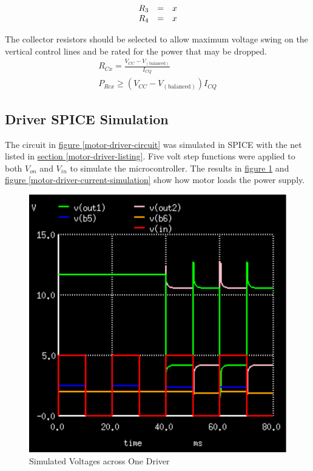 \documentclass[10pt, twocolumn]{article}
\begin{document}
\begin{equation}
\begin{array}{r c l}
R_{3}	&=&	x\\
R_{4}	&=&	x\\
\end{array}
\label{Rbias34-eq}
\end{equation}

The collector resistors should be selected to allow maximum voltage
swing on the vertical control lines and be rated for the power
that may be dropped.
\begin{equation}
\begin{array}{c}
R_{Cx}=\frac{V_{CC}-V_{(\textrm{balanced})}}{I_{CQ}}	\\
P_{Rcx}\geq (V_{CC}-V_{(\textrm{balanced})})I_{CQ}
\end{array}
\label{Rcs-eq}
\end{equation}


\subsection{Driver SPICE Simulation}

The circuit in
\hyperref[motor-driver-circuit]{figure \ref{motor-driver-circuit}}
was simulated in SPICE with the net listed in
\hyperref[motor-driver-listing]{section \ref{motor-driver-listing}}.
Five volt step functions were applied to both $V_{on}$ and $V_{in}$ to simulate the microcontroller.
The results in 
\hyperref[motor-driver-voltage-simulation]{figure \ref{motor-driver-voltage-simulation}}
and
\hyperref[motor-driver-current-simulation]{figure \ref{motor-driver-current-simulation}}
show how motor loads the power supply.

\begin{figure}
	\centering
	\includegraphics[width=0.75\columnwidth]{Figures/motor-driver-voltage-simulation.pdf}
	\caption{Simulated Voltages across One Driver}
	\label{motor-driver-voltage-simulation}
\end{figure}
\end{document}
